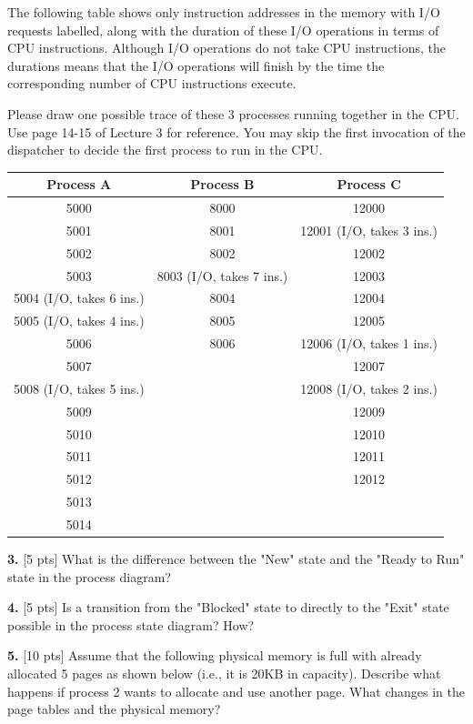 \documentclass[12pt]{article}
\begin{document}
The following table shows only instruction addresses in the memory with I/O requests labelled, along with the duration of these I/O operations in terms of CPU instructions. Although I/O operations do not take CPU instructions, the durations means that the I/O operations will finish by the time the corresponding number of CPU instructions execute.

Please draw one possible trace of these 3 processes running together in the CPU. Use page 14-15 of Lecture 3 for reference. You may skip the first invocation of the dispatcher to decide the first process to run in the CPU. 

\begin{center}
\begin{tabular}{| c | c | c |}
\hline
{\bf Process A} & {\bf Process B} & {\bf Process C}\\
\hline\hline
5000 & 8000 & 12000\\
\hline
5001 & 8001 & 12001 (I/O, takes 3 ins.)\\
\hline
5002 & 8002 & 12002\\
\hline
5003 & 8003 (I/O, takes 7 ins.) & 12003\\
\hline
5004 (I/O, takes 6 ins.) & 8004 & 12004\\
\hline
5005 (I/O, takes 4 ins.) & 8005 & 12005\\
\hline
5006 & 8006 & 12006 (I/O, takes 1 ins.)\\
\hline
5007 & & 12007\\
\hline
5008 (I/O, takes 5 ins.) & & 12008 (I/O, takes 2 ins.)\\
\hline
5009 & & 12009\\
\hline
5010 & & 12010\\
\hline
5011 & & 12011\\
\hline
5012 & & 12012\\
\hline
5013 & & \\
\hline
5014 & & \\
\hline
\end{tabular}
\end{center}

{\bf 3.} [5 pts] What is the difference between the "New" state and the "Ready to Run" state in the process diagram?

{\bf 4.} [5 pts] Is a transition from the "Blocked" state to directly to the "Exit" state possible in the process state diagram? How?

{\bf 5.} [10 pts] Assume that the following physical memory is full with already allocated 5 pages as shown below (i.e., it is 20KB in capacity). Describe what happens if process 2 wants to allocate and use another page. What changes in the page tables and the physical memory? 
\end{document}
